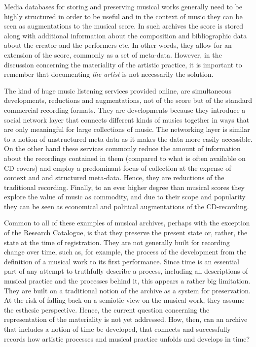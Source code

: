 \documentclass[11pt,a4paper]{article}
\begin{document}
Media databases for storing and preserving musical works generally need to be highly structured in order to be useful and in the context of music they can be seen as augmentations to the musical score. In such archives the score is stored along with additional information about the composition and bibliographic data about the creator and the performers etc. In other words, they allow for an extension of the score, commonly as a set of meta-data. However, in the discussion concerning the materiality of the artistic practice, it is important to remember that documenting \emph{the artist} is not necessarily the solution.

The kind of huge music listening services provided online, are simultaneous developments, reductions and augmentations, not of the score but of the standard commercial recording formats. They are developments because they introduce a social network layer that connects different kinds of musics together in ways that are only meaningful for large collections of music. The networking layer is similar to a notion of unstructured meta-data as it makes the data more easily accessible. On the other hand these services commonly reduce the amount of information about the recordings contained in them (compared to what is often available on CD covers) and employ a predominant focus of collection at the expense of context and and structured meta-data. Hence, they are reductions of the traditional recording. Finally, to an ever higher degree than musical scores they explore the value of music as commodity, and due to their scope and popularity they can be seen as economical and political augmentations of the CD-recording.

Common to all of these examples of musical archives, perhaps with the exception of the Research Catalogue, is that they preserve the present state or, rather, the state at the time of registration. They are not generally built for recording change over time, such as, for example, the process of the development from the definition of a musical work to its first performance. Since time is an essential part of any attempt to truthfully describe a process, including all descriptions of musical practice and the processes behind it, this appears a rather big limitation. They are built on a traditional notion of the archive as a system for preservation. At the risk of falling back on a semiotic view on the musical work, they assume the esthesic perspective. Hence, the current question concerning the representation of the materiality is not yet addressed. How, then, can an archive that includes a notion of time be developed, that connects and successfully records how artistic processes and musical practice unfolds and develops in time?
\end{document}
